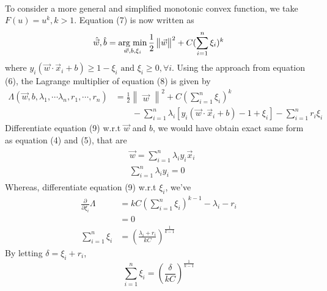 \documentclass{article}
\begin{document}
\paragraph{}
To consider a more general and simplified monotonic convex function, we take $F(u)=u^k, k>1$. Equation (7) is now written as
\begin{equation}
    \hat{\Vec{w}}, \hat{b} = \operatorname*{arg \hspace{1mm} min}_{\Vec{w}, b, \xi_i} \frac{1}{2} \begin{Vmatrix}
    \Vec{w} \end{Vmatrix}^2 + C (\displaystyle\sum_{i=1}^{n} \xi_i)^k
\end{equation}
where $y_i(\Vec{w} \cdot \Vec{x}_i + b) \geq 1-\xi_i \text{ and } \xi_i \geq 0, \forall i$. Using the approach from equation (6), the Lagrange multiplier of equation (8) is given by
\begin{align}
    \Lambda(\Vec{w}, b, \lambda_1, \cdots \lambda_n, r_1, \cdots, r_n) &=
    \frac{1}{2}\begin{Vmatrix} \Vec{w}\end{Vmatrix}^2 + C(\displaystyle\sum_{i=1}^{n} \xi_i)^k \nonumber \\
    &\qquad {} -\displaystyle\sum_{i=1}^{n}\lambda_i[y_i(\Vec{w} \cdot \Vec{x}_i + b)-1+\xi_i] - \displaystyle\sum_{i=1}^{n} r_i \xi_i
\end{align}
Differentiate equation (9) w.r.t $\Vec{w}$ and $b$, we would have obtain exact same form as equation (4) and (5), that are
\begin{align}
    \begin{split}
        &\Vec{w} = \displaystyle\sum_{i=1}^{n} \lambda_i y_i\Vec{x}_i \\
        &\displaystyle\sum_{i=1}^{n} \lambda_i y_i = 0
    \end{split}
\end{align}
Whereas, differentiate equation (9) w.r.t $\xi_i$, we've
\begin{align*}
   \frac{\partial}{\partial\xi_i}\Lambda &= kC(\displaystyle\sum_{i=1}^{n}\xi_i)^{k-1}-\lambda_i-r_i \\
   &= 0 \\
   \displaystyle\sum_{i=1}^{n} \xi_i &= (\frac{\lambda_i+r_i}{kC})^\frac{1}{k-1}
\end{align*}
By letting $\delta = \xi_i + r_i$,
\begin{equation}
    \displaystyle\sum_{i=1}^{n} \xi_i = (\frac{\delta}{kC})^\frac{1}{k-1}
\end{equation}
\end{document}
